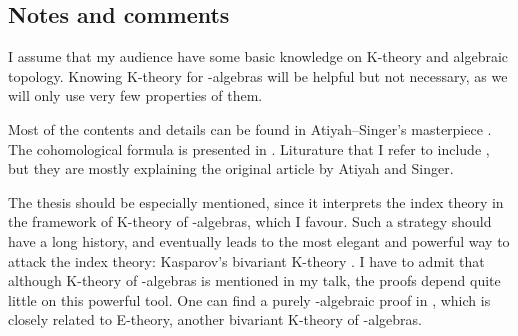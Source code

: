 \documentclass[reqno]{scrartcl}
\theoremstyle{definition}
\newtheorem{definition}[theorem]{Definition}
\theoremstyle{remark}
\begin{document}
\subsection*{Notes and comments}
I assume that my audience have some basic knowledge on K-theory and algebraic topology. Knowing K-theory for \Cst-algebras will be helpful but not necessary, as we will only use very few properties of them.

Most of the contents and details can be found in Atiyah--Singer's masterpiece \cite{atiyahsinger1}. The cohomological formula is presented in \cite{atiyahsinger3}. Liturature that I refer to include \cite{mukherjee2013atiyah,shanahan2006atiyah,landweber2005k}, but they are mostly explaining the original article by Atiyah and Singer.

The thesis \cite{vanerp} should be especially mentioned, since it interprets the index theory in the framework of K-theory of \Cst-algebras, which I favour. Such a strategy should have a long history, and eventually leads to the most elegant and powerful way to attack the index theory: Kasparov's bivariant K-theory \cite{kasparov1988equivariant}. I have to admit that although K-theory of \Cst-algebras is mentioned in my talk, the proofs depend quite little on this powerful tool. One can find a purely \Cst-algebraic proof in \cite{higson1993k}, which is closely related to E-theory, another bivariant K-theory of \Cst-algebras.


\iffalse

\setcounter{section}{0}
\renewcommand\theHsection{P2.\thesection}
\renewcommand\thesection{\Alph{section}}
\section{Sobolev spaces}
In order to define analytical indices for (pseudo)differential operators $D\colon\Cinfty(M)\to\Cinfty(M)$, we need to first complete $\Cinfty(M)$ into a Hilbert space. We need to define Sobolev spaces $\Sob{s}$.


Let $M$ be a compact manifold. Let $\Delta\colon\Cinfty(M)\to\Cinfty(M)$ be the Laplace-Beltrami operator on $M$. The spectral theory of Laplacians claims that $\Delta-1\colon\Cinfty(M)\to\Cinfty(M)$ is a bijection. 

\begin{definition}
The Sobolev $s$-norm of $u\in\Cinfty(M)$ is
\[ \norm{u}_s\defeq\norm{(1-\Delta)^{t/2}u}_{L^2(M)}, \]
where $\norm{\cdot}_{L^2(M)}$ denotes the norm on $L^2(M)$. The Sobolev space $\Sob{s}(M)$ is defined as the completion $\Cinfty(M)$ under the Sobolev $s$-norm.
\end{definition}

We state the following results without proving them:

\section{Unbounded Fredholm operators}

\fi






\end{document}
